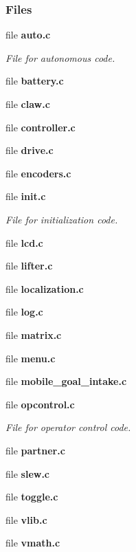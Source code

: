\subsubsection*{Files}
\begin{DoxyCompactItemize}
\item 
file \textbf{ auto.\+c}
\begin{DoxyCompactList}\small\item\em File for autonomous code. \end{DoxyCompactList}\item 
file \textbf{ battery.\+c}
\item 
file \textbf{ claw.\+c}
\item 
file \textbf{ controller.\+c}
\item 
file \textbf{ drive.\+c}
\item 
file \textbf{ encoders.\+c}
\item 
file \textbf{ init.\+c}
\begin{DoxyCompactList}\small\item\em File for initialization code. \end{DoxyCompactList}\item 
file \textbf{ lcd.\+c}
\item 
file \textbf{ lifter.\+c}
\item 
file \textbf{ localization.\+c}
\item 
file \textbf{ log.\+c}
\item 
file \textbf{ matrix.\+c}
\item 
file \textbf{ menu.\+c}
\item 
file \textbf{ mobile\+\_\+goal\+\_\+intake.\+c}
\item 
file \textbf{ opcontrol.\+c}
\begin{DoxyCompactList}\small\item\em File for operator control code. \end{DoxyCompactList}\item 
file \textbf{ partner.\+c}
\item 
file \textbf{ slew.\+c}
\item 
file \textbf{ toggle.\+c}
\item 
file \textbf{ vlib.\+c}
\item 
file \textbf{ vmath.\+c}
\end{DoxyCompactItemize}
